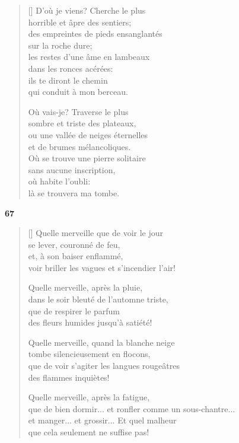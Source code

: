 \documentclass[a4paper,12pt]{book}
\begin{document}
\begin{verse}[\versewidth]
  D'où je viens? Cherche le plus \\
  horrible et âpre des sentiers; \\
  des empreintes de pieds ensanglantés \\
  sur la roche dure; \\
  les restes d'une âme en lambeaux \\
  dans les ronces acérées: \\
  ils te diront le chemin \\
  qui conduit à mon berceau.

  Où vais-je? Traverse le plus \\
  sombre et triste des plateaux, \\
  ou une vallée de neiges éternelles \\
  et de brumes mélancoliques. \\
  Où se trouve une pierre solitaire \\
  sans aucune inscription, \\
  où habite l'oubli: \\
  là se trouvera ma tombe.
\end{verse}

\bigskip

\begin{center}
  \textbf{67}
\end{center}

\settowidth{\versewidth}{que de bien dormir... et ronfler comme un sous-chantre...}

\begin{verse}[\versewidth]
  Quelle merveille que de voir le jour \\
  se lever, couronné de feu, \\
  et, à son baiser enflammé, \\
  voir briller les vagues et s'incendier l'air!

  Quelle merveille, après la pluie, \\
  dans le soir bleuté de l'automne triste, \\
  que de respirer le parfum \\
  des fleurs humides jusqu'à satiété!

  Quelle merveille, quand la blanche neige \\
  tombe silencieusement en flocons, \\
  que de voir s'agiter les langues rougeâtres \\
  des flammes inquiètes!

  Quelle merveille, après la fatigue, \\
  que de bien dormir... et ronfler comme un sous-chantre... \\
  et manger... et grossir... Et quel malheur \\
  que cela seulement ne suffise pas!
\end{verse}
\end{document}
